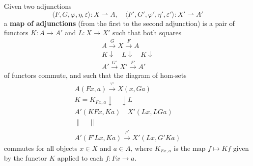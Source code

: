 Given two adjunctions
$$\langle F, G, \varphi, \eta, \varepsilon \rangle : X \rightharpoonup A, \quad \langle F', G', \varphi', \eta', \varepsilon' \rangle : X' \rightharpoonup A'$$
a \textbf{map of adjunctions} (from the first to the second adjunction) is a pair of functors $K : A \to A'$ and $L : X \to X'$ such that both squares
$$\begin{array}{c}
A \xrightarrow{G} X \xrightarrow{F} A \\
K \downarrow \quad L \downarrow \quad K \downarrow \\
A' \xrightarrow{G'} X' \xrightarrow{F'} A'
\end{array}$$
of functors commute, and such that the diagram of hom-sets
$$\begin{array}{c}
A(Fx, a) \xrightarrow{\varphi} X(x, Ga) \\
K = K_{Fx, a} \downarrow \quad \downarrow L \\
A'(KFx, Ka) \quad X'(Lx, LGa) \\
\parallel \quad \parallel \\
A'(F'Lx, Ka) \xrightarrow{\varphi'} X'(Lx, G'Ka)
\end{array}$$
commutes for all objects $x \in X$ and $a \in A$, where $K_{Fx, a}$ is the map $f \mapsto Kf$ given by the functor $K$ applied to each $f : Fx \to a$.
